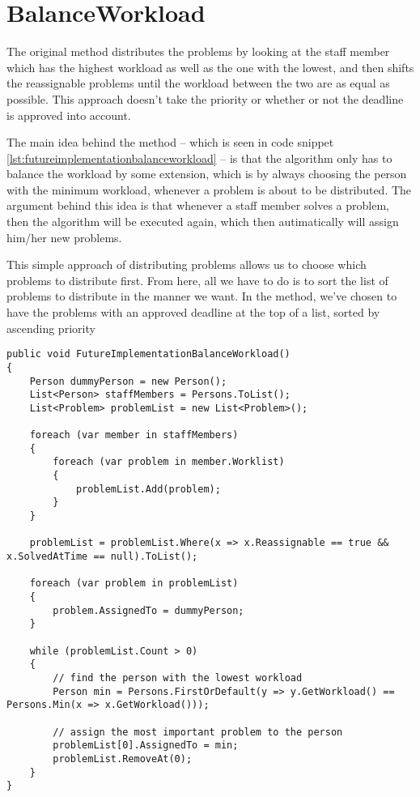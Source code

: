 \section{BalanceWorkload}
\label{sec:futureimplementationbalanceworkload}

The original  method distributes the problems by looking at the staff member which has the highest workload as well as the one with the lowest, and then shifts the reassignable problems until the workload between the two are as equal as possible. This approach doesn't take the priority or whether or not the deadline is approved into account. 

The main idea behind the  method -- which is seen in code snippet \ref{lst:futureimplementationbalanceworkload} -- is that the algorithm only has to balance the workload by some extension, which is by always choosing the person with the minimum workload, whenever a problem is about to be distributed. The argument behind this idea is that whenever a staff member solves a problem, then the algorithm will be executed again, which then autimatically will assign him/her new problems.

This simple approach of distributing problems allows us to choose which problems to distribute first. From here, all we have to do is to sort the list of problems to distribute in the manner we want. In the  method, we've chosen to have the problems with an approved deadline at the top of a list, sorted by ascending priority

\begin{lstlisting}[style=sourceCode, caption=\myCaption{A possible future implementation of the \me{BalanceWorkload} algorithm.}, label=lst:futureimplementationbalanceworkload]
public void FutureImplementationBalanceWorkload()
{
    Person dummyPerson = new Person();
    List<Person> staffMembers = Persons.ToList();
    List<Problem> problemList = new List<Problem>();

    foreach (var member in staffMembers)
    {
        foreach (var problem in member.Worklist)
        {
            problemList.Add(problem);
        }
    }

    problemList = problemList.Where(x => x.Reassignable == true && x.SolvedAtTime == null).ToList();

    foreach (var problem in problemList)
    {
        problem.AssignedTo = dummyPerson;
    }

    while (problemList.Count > 0)
    {
        // find the person with the lowest workload
        Person min = Persons.FirstOrDefault(y => y.GetWorkload() == Persons.Min(x => x.GetWorkload()));

        // assign the most important problem to the person
        problemList[0].AssignedTo = min;
        problemList.RemoveAt(0);
    }
}
\end{lstlisting}

